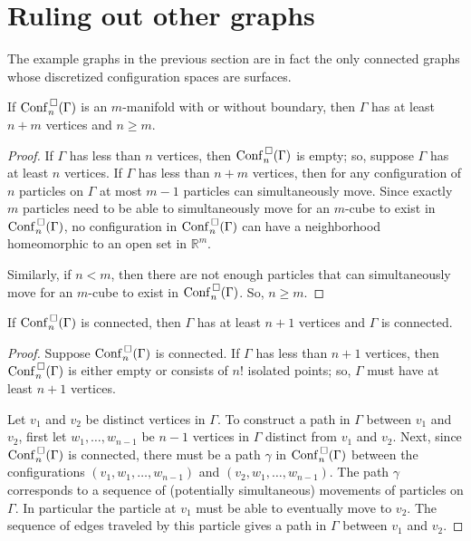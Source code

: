 \section{Ruling out other graphs}
The example graphs in the previous section are in fact the only connected graphs
whose discretized configuration spaces are surfaces.

\begin{lem}
\label{lem:is_surface_0}
If \(\mathrm{Conf}^{\,\square}_n(\Gamma)\) is an \(m\)-manifold with or without boundary, then \(\Gamma\) has at least \(n+m\) vertices and \(n \ge m\).
\end{lem}
\begin{proof}
    If \(\Gamma\) has less than \(n\) vertices, then \(\mathrm{Conf}^{\,\square}_n(\Gamma)\) is empty;
    so, suppose \(\Gamma\) has at least \(n\) vertices.
    If \(\Gamma\) has less than \(n + m\) vertices, then
    for any configuration of \(n\) particles on \(\Gamma\)
    at most \(m-1\) particles can simultaneously move.
    Since exactly \(m\) particles need to be able to simultaneously move for an \(m\)-cube 
    to exist in \(\mathrm{Conf}^{\,\square}_n(\Gamma)\), no configuration in \(\mathrm{Conf}^{\,\square}_n(\Gamma)\)
    can have a neighborhood homeomorphic to an open set in \(\mathbb{R}^m\).

    Similarly, if \(n < m\), then there are not enough particles that can simultaneously move
    for an \(m\)-cube to exist in \(\mathrm{Conf}^{\,\square}_n(\Gamma)\). So, \(n \ge m\). 
\end{proof}

\begin{lem}
    \label{lem:is_connected_0}
    If \(\mathrm{Conf}^{\,\square}_n(\Gamma)\) is connected, then \(\Gamma\) has at least \(n + 1\) vertices
    and \(\Gamma\) is connected.
\end{lem}
\begin{proof}
    Suppose \(\mathrm{Conf}^{\,\square}_n(\Gamma)\) is connected.
    If \(\Gamma\) has less than \(n + 1\) vertices, then \(\mathrm{Conf}^{\,\square}_n(\Gamma)\) is either empty or
    consists of \(n!\) isolated points; so, \(\Gamma\) must have at least \(n+1\) vertices.

    Let \(v_1\) and \(v_2\) be distinct vertices in \(\Gamma\).
    To construct a path in \(\Gamma\) between \(v_1\) and \(v_2\), first let \(w_1, \ldots, w_{n-1}\)
    be \(n-1\) vertices in \(\Gamma\) distinct from \(v_1\) and \(v_2\).
    Next, since \(\mathrm{Conf}^{\,\square}_n(\Gamma)\) is connected, there must be a path \(\gamma\)
    in \(\mathrm{Conf}^{\,\square}_n(\Gamma)\) between the configurations
    \((v_1, w_1, \ldots, w_{n-1})\) and \((v_2, w_1, \ldots, w_{n-1})\).
    The path \(\gamma\) corresponds to a sequence of (potentially simultaneous) movements of particles on \(\Gamma\).
    In particular the particle at \(v_1\) must be able to eventually move to \(v_2\).
    The sequence of edges traveled by this particle gives a path in \(\Gamma\) between \(v_1\) and \(v_2\).
\end{proof}


